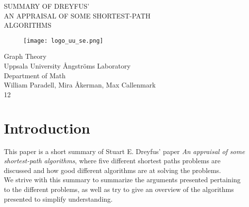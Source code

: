 \documentclass{article}
\begin{document}
\thispagestyle{empty}

\vspace*{+2em}
\begin{center}
    {\LARGE SUMMARY OF DREYFUS' \\
    AN APPRAISAL OF SOME SHORTEST-PATH \\
    ALGORITHMS\\}
\vspace*{+4em}


\vspace*{+3em}
\begin{figure}[h]
    \centering
    \texttt{[image: logo\_uu\_se.png]}
\end{figure}

\vspace*{+3em}
Graph Theory \\
Uppsala University Ångströms Laboratory\\
Department of Math\\
\vspace*{+2em}
William Paradell, Mira Åkerman, Max Callenmark\\

\vspace*{+10em}
12

\end{center}

\newpage

\section{Introduction}

This paper is a short summary of Stuart E. Dreyfus' paper 
\textit{An appraisal of some shortest-path algorithms}, where five 
different shortest paths problems are discussed and how good 
different algorithms are at solving the problems.  \\
\indent We strive with this summary to summarize the arguments presented
pertaining to the different problems, as well as try to give an 
overview of the algorithms presented to simplify understanding. 
\end{document}
